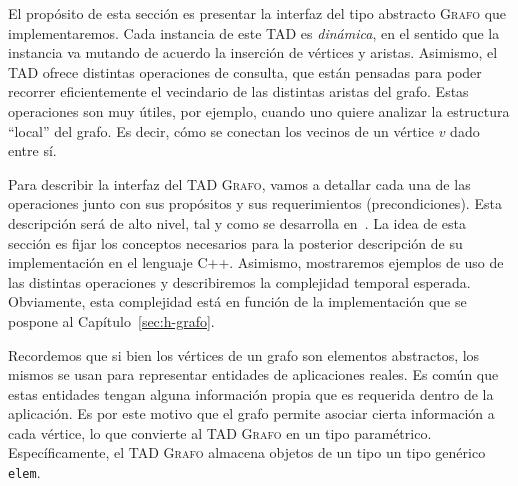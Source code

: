 \documentclass[%
    a4paper,%
    fontsize=12pt,%
    DIV=12,
    twoside,%
    openright,%
    titlepage=true,%
    headsepline,%
    toc=bibliography,%
    parskip=half,%
    cleardoublepage=empty,%
    headings=big,%
]{scrbook}
\makeatletter
\newcommand{\Grafo}{\textsc{Grafo}\xspace}
\newcommand{\Code}[1]{\lstinline[basicstyle={\ttfamily}]@#1@}
\DeclareRobustCommand{\CPP}{C\nolinebreak[4]\hspace{-.05em}\raisebox{.4ex}{\relsize{-3}\textbf{++}}\xspace}
\def\CPP{C++}%
\makeatother
\begin{document}
\def\lstlistingname{Pseudocódigo}
 
El propósito de esta sección es presentar la interfaz del tipo abstracto \Grafo que implementaremos.  Cada instancia de este TAD es \emph{dinámica}, en el sentido que la instancia va mutando de acuerdo la inserción de vértices y aristas.  Asimismo, el TAD ofrece distintas operaciones de consulta, que están pensadas para poder recorrer eficientemente el vecindario de las distintas aristas del grafo.  Estas operaciones son muy útiles, por ejemplo, cuando uno quiere analizar la estructura ``local'' del grafo.  Es decir, cómo se conectan los vecinos de un vértice $v$ dado entre sí.  

Para describir la interfaz del TAD \Grafo, vamos a detallar cada una de las operaciones junto con sus propósitos y sus requerimientos (precondiciones).  Esta descripción será de alto nivel, tal y como se desarrolla en~\cite{LinSoulignacSzwarcfiterTCS2012}.  La idea de esta sección es fijar los conceptos necesarios para la posterior descripción de su implementación en el lenguaje \CPP.  Asimismo, mostraremos ejemplos  de uso de las distintas operaciones y describiremos la complejidad temporal esperada.  Obviamente, esta complejidad está en función de la implementación que se pospone al Capítulo~\ref{sec:h-grafo}.  

Recordemos que si bien los vértices de un grafo son elementos abstractos, los mismos se usan para representar entidades de aplicaciones reales.  Es común que estas entidades tengan alguna información propia que es requerida dentro de la aplicación.  Es por este motivo que el grafo permite asociar cierta información a cada vértice, lo que convierte al TAD \Grafo en un tipo paramétrico.  Específicamente, el TAD \Grafo almacena objetos de un tipo un tipo genérico \Code{elem}.
\end{document}
